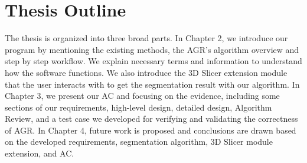 \section{Thesis Outline} \label{TO}

The thesis is organized into three broad parts. In Chapter 2, we introduce our program \progname{} by mentioning the existing methods, the AGR's algorithm overview and step by step  workflow. We explain necessary terms and information to understand how the software functions. We also introduce the 3D Slicer \cite{Kikinis2014} extension module that the user interacts with to get the segmentation result with our algorithm. In Chapter 3, we present our AC and focusing on the evidence, including  some sections of our requirements, high-level design, detailed design, Algorithm Review, and a test case we developed for verifying and validating the correctness of AGR. In Chapter 4, future work is proposed and conclusions are drawn based on the developed requirements, segmentation algorithm, 3D Slicer module extension, and AC.